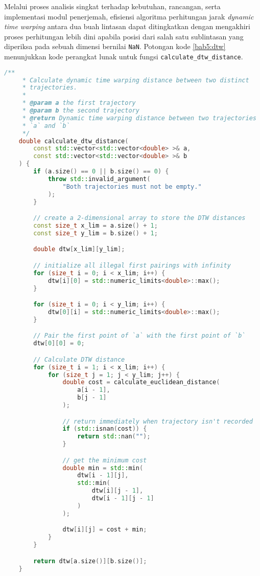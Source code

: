 Melalui proses analisis singkat terhadap kebutuhan, rancangan, serta implementasi modul penerjemah, efisiensi algoritma perhitungan jarak \textit{dynamic time warping} antara dua buah lintasan dapat ditingkatkan dengan mengakhiri proses perhitungan lebih dini apabila posisi dari salah satu sublintasan yang diperiksa pada sebuah dimensi bernilai \texttt{NaN}. Potongan kode \ref{bab5:dtw} menunjukkan kode perangkat lunak untuk fungsi \texttt{calculate\_dtw\_distance}.

\begin{lstlisting}[language=C++, caption=Implementasi fungsi \texttt{calculate\_dtw\_distance}, label={bab5:dtw}]
    /**
     * Calculate dynamic time warping distance between two distinct
     * trajectories.
     * 
     * @param a the first trajectory
     * @param b the second trajectory
     * @return Dynamic time warping distance between two trajectories
     * `a` and `b`
     */
    double calculate_dtw_distance(
        const std::vector<std::vector<double> >& a,
        const std::vector<std::vector<double> >& b
    ) {
        if (a.size() == 0 || b.size() == 0) {
            throw std::invalid_argument(
                "Both trajectories must not be empty."
            );
        }

        // create a 2-dimensional array to store the DTW distances
        const size_t x_lim = a.size() + 1;
        const size_t y_lim = b.size() + 1;

        double dtw[x_lim][y_lim];

        // initialize all illegal first pairings with infinity
        for (size_t i = 0; i < x_lim; i++) {
            dtw[i][0] = std::numeric_limits<double>::max();        
        }

        for (size_t i = 0; i < y_lim; i++) {
            dtw[0][i] = std::numeric_limits<double>::max();
        }

        // Pair the first point of `a` with the first point of `b`
        dtw[0][0] = 0;

        // Calculate DTW distance
        for (size_t i = 1; i < x_lim; i++) {
            for (size_t j = 1; j < y_lim; j++) {
                double cost = calculate_euclidean_distance(
                    a[i - 1],
                    b[j - 1]
                );

                // return immediately when trajectory isn't recorded
                if (std::isnan(cost)) {
                    return std::nan("");
                }

                // get the minimum cost
                double min = std::min(
                    dtw[i - 1][j],
                    std::min(
                        dtw[i][j - 1],
                        dtw[i - 1][j - 1]
                    )
                );

                dtw[i][j] = cost + min;
            }
        }

        return dtw[a.size()][b.size()];
    }
\end{lstlisting}

